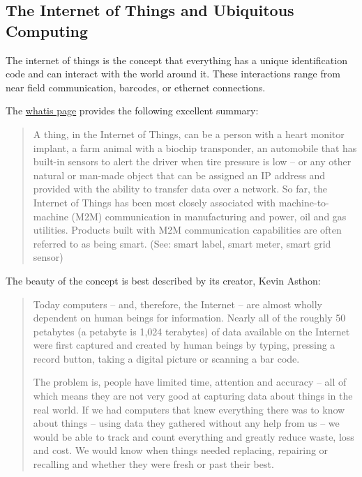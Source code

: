 	\subsection{The Internet of Things and Ubiquitous Computing}
	
		The internet of things is the concept that everything has a unique identification code and can interact with the world around it.
		These interactions range from near field communication, barcodes, or ethernet connections.
		
		The \href{http://whatis.techtarget.com/definition/Internet-of-Things}{whatis page} provides the following excellent summary:
		
		\begin{quote}
			A thing, in the Internet of Things, can be a person with a heart monitor implant, a farm animal with a biochip transponder, an automobile that has built-in sensors to alert the driver when tire pressure is low -- or any other natural or man-made object that can be assigned an IP address and provided with the ability to transfer data over a network. So far, the Internet of Things has been most closely associated with machine-to-machine (M2M) communication in manufacturing and power, oil and gas utilities. Products built with M2M communication capabilities are often referred to as being smart. (See: smart label, smart meter, smart grid sensor)
		\end{quote}
		
		The beauty of the concept is best described by its creator, Kevin Asthon:
		
		\begin{quote}
			Today computers -- and, therefore, the Internet -- are almost wholly dependent on human beings for information. Nearly all of the roughly 50 petabytes (a petabyte is 1,024 terabytes) of data available on the Internet were first captured and created by human beings by typing, pressing a record button, taking a digital picture or scanning a bar code. 
			
			The problem is, people have limited time, attention and accuracy -- all of which means they are not very good at capturing data about things in the real world. If we had computers that knew everything there was to know about things -- using data they gathered without any help from us -- we would be able to track and count everything and greatly reduce waste, loss and cost. We would know when things needed replacing, repairing or recalling and whether they were fresh or past their best.
		\end{quote}
		
